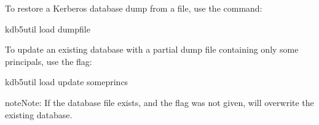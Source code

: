 \documentclass[letterpaper,10pt,english]{sphinxmanual}
\begin{document}
\sphinxAtStartPar
To restore a Kerberos database dump from a file, use the
{\hyperref[\detokenize{admin/admin_commands/kdb5_util:kdb5-util-8}]{}}  command:

\begin{sphinxVerbatim}[commandchars=\\\{\}]
\PYGZdl{} kdb5\PYGZus{}util load dumpfile
\end{sphinxVerbatim}

\sphinxAtStartPar
To update an existing database with a partial dump file containing
only some principals, use the  flag:

\begin{sphinxVerbatim}[commandchars=\\\{\}]
\PYGZdl{} kdb5\PYGZus{}util load \PYGZhy{}update someprincs
\end{sphinxVerbatim}

\begin{sphinxadmonition}{note}{Note:}
\sphinxAtStartPar
If the database file exists, and the  flag was not
given,  will overwrite the existing database.
\end{sphinxadmonition}
\end{document}
